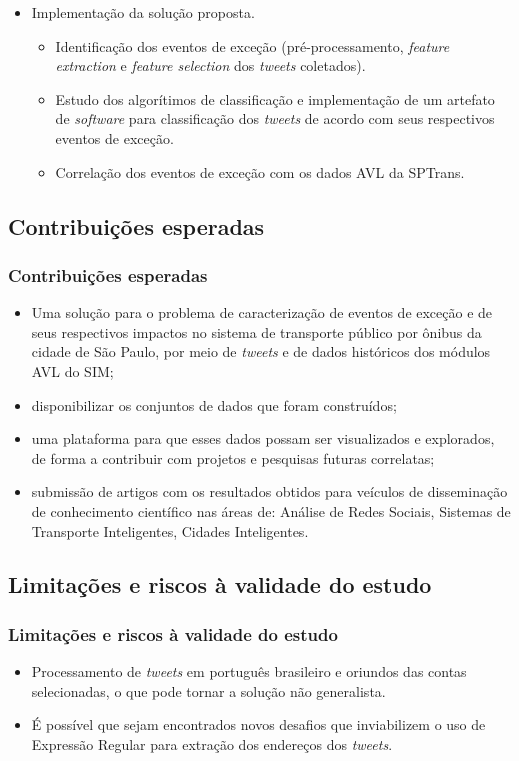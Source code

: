 \documentclass{beamer}
\begin{document}
\begin{frame}
\begin{itemize}
\item Implementação da solução proposta.
\begin{itemize}
\item Identificação dos eventos de exceção (pré-processamento, \textit{feature extraction} e \textit{feature selection} dos \textit{tweets} coletados).
\item Estudo dos algorítimos de classificação e implementação de um artefato de \textit{software} para classificação dos \textit{tweets} de acordo com seus respectivos eventos de exceção.
\item Correlação dos eventos de exceção com os dados AVL da SPTrans.
\end{itemize}
\end{itemize}

\end{frame}
\subsection{Contribuições esperadas}
\begin{frame}
\frametitle{Contribuições esperadas}
\begin{itemize}
\item Uma solução para o problema de caracterização de eventos de exceção e de seus respectivos impactos no sistema de transporte público por ônibus da cidade de São Paulo, por meio de \textit{tweets} e de dados históricos dos módulos AVL do SIM;
\item disponibilizar os conjuntos de dados que foram construídos;
\item uma plataforma para que esses dados possam ser visualizados e explorados, de forma a contribuir com projetos e pesquisas futuras correlatas;
\item submissão de artigos com os resultados obtidos para veículos de disseminação de conhecimento científico nas áreas de: Análise de Redes Sociais, Sistemas de Transporte Inteligentes, Cidades Inteligentes.
\end{itemize}
\end{frame}
\subsection{Limitações e riscos à validade do estudo}
\begin{frame}
\frametitle{Limitações e riscos à validade do estudo}
\begin{itemize}
\item Processamento de \textit{tweets} em português brasileiro e oriundos das contas selecionadas, o que pode tornar a solução não generalista. 
\item É possível que sejam encontrados novos desafios que inviabilizem o uso de Expressão Regular para extração dos endereços dos \textit{tweets}.
\end{itemize}
\end{frame}
\end{document}
